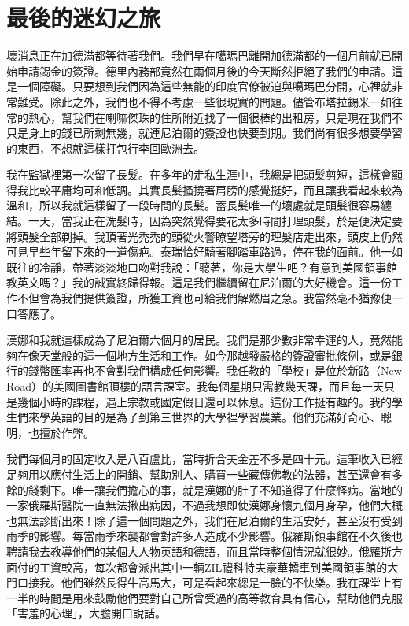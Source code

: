 \chapter{最後的迷幻之旅}

壞消息正在加德滿都等待著我們。我們早在噶瑪巴離開加德滿都的一個月前就已開始申請錫金的簽證。德里內務部竟然在兩個月後的今天斷然拒絕了我們的申請。這是一個障礙。只要想到我們因為這些無能的印度官僚被迫與噶瑪巴分開，心裡就非常難受。除此之外，我們也不得不考慮一些很現實的問題。儘管布塔拉錫米一如往常的熱心，幫我們在喇嘛傑珠的住所附近找了一個很棒的出租房，只是現在我們不只是身上的錢已所剩無幾，就連尼泊爾的簽證也快要到期。我們尚有很多想要學習的東西，不想就這樣打包行李回歐洲去。

我在監獄裡第一次留了長髮。在多年的走私生涯中，我總是把頭髮剪短，這樣會顯得我比較平庸均可和低調。其實長髮搔撓著肩膀的感覺挺好，而且讓我看起來較為溫和，所以我就這樣留了一段時間的長髮。蓄長髮唯一的壞處就是頭髮很容易纏結。一天，當我正在洗髮時，因為突然覺得要花太多時間打理頭髮，於是便決定要將頭髮全部剃掉。我頂著光禿禿的頭從火警瞭望塔旁的理髮店走出來，頭皮上仍然可見早些年留下來的一道傷疤。泰瑞恰好騎著腳踏車路過，停在我的面前。他一如既往的冷靜，帶著淡淡地口吻對我說：「聽著，你是大學生吧？有意到美國領事館教英文嗎？」我的誠實終歸得報。這是我們繼續留在尼泊爾的大好機會。這一份工作不但會為我們提供簽證，所獲工資也可給我們解燃眉之急。我當然毫不猶豫便一口答應了。

漢娜和我就這樣成為了尼泊爾六個月的居民。我們是那少數非常幸運的人，竟然能夠在像天堂般的這一個地方生活和工作。如今那越發嚴格的簽證審批條例，或是銀行的錢幣匯率再也不會對我們構成任何影響。我任教的「學校」是位於新路（New
Road）的美國圖書館頂樓的語言課室。我每個星期只需教幾天課，而且每一天只是幾個小時的課程，遇上宗教或國定假日還可以休息。這份工作挺有趣的。我的學生們來學英語的目的是為了到第三世界的大學裡學習農業。他們充滿好奇心、聰明，也擅於作弊。

我們每個月的固定收入是八百盧比，當時折合美金差不多是四十元。這筆收入已經足夠用以應付生活上的開銷、幫助別人、購買一些藏傳佛教的法器，甚至還會有多餘的錢剩下。唯一讓我們擔心的事，就是漢娜的肚子不知道得了什麼怪病。當地的一家俄羅斯醫院一直無法揪出病因，不過我想即使漢娜身懷九個月身孕，他們大概也無法診斷出來！除了這一個問題之外，我們在尼泊爾的生活安好，甚至沒有受到雨季的影響。每當雨季來襲都會對許多人造成不少影響。俄羅斯領事館在不久後也聘請我去教導他們的某個大人物英語和德語，而且當時整個情況就很妙。俄羅斯方面付的工資較高，每次都會派出其中一輛ZIL禮科特夫豪華轎車到美國領事館的大門口接我。他們雖然長得牛高馬大，可是看起來總是一臉的不快樂。我在課堂上有一半的時間是用來鼓勵他們要對自己所曾受過的高等教育具有信心，幫助他們克服「害羞的心理」，大膽開口說話。

